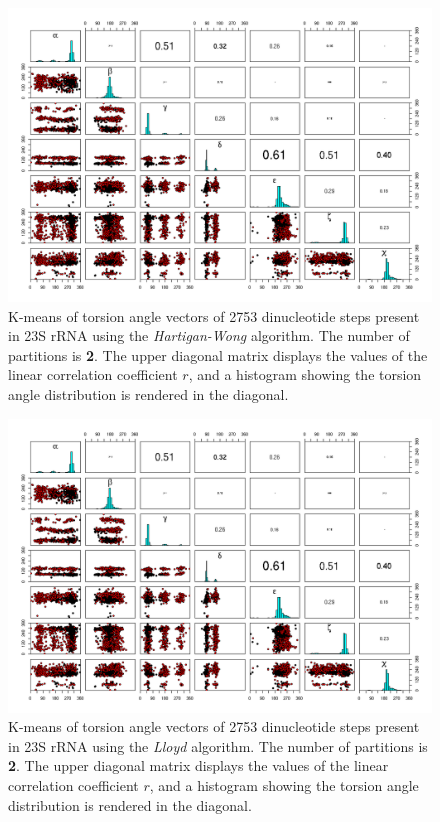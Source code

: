 \begin{figure}[htbp]
\centering
\includegraphics[angle=90, scale=0.50]{hartigan_tor_b.png}
\caption{
K-means of torsion  angle vectors of 2753 dinucleotide steps
present in  23S rRNA using the  \textit{Hartigan-Wong} algorithm.  The
number  of  partitions  is  \textbf{2}.   The  upper  diagonal  matrix
displays the values  of the linear correlation coefficient  $r$, and a
histogram showing  the torsion angle distribution is rendered  in the
diagonal.}
\label{fig:hartigan}
\end{figure}

\begin{figure}[htbp]
\centering
\includegraphics[angle=90, scale=0.50]{lloyd_tor_b.png}
\caption{
K-means of torsion  angle vectors of 2753 dinucleotide steps
present in  23S rRNA using the  \textit{Lloyd} algorithm.  The
number  of  partitions  is  \textbf{2}.   The  upper  diagonal  matrix
displays the values  of the linear correlation coefficient  $r$, and a
histogram showing  the torsion angle  distribution is rendered  in the
diagonal.}
\end{figure}

